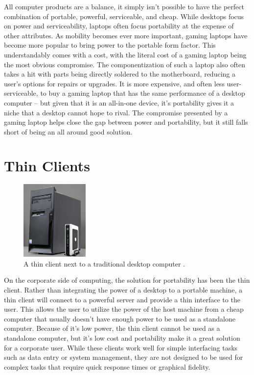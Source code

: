 All computer products are a balance, it simply isn't possible to have the perfect combination of portable, powerful, serviceable, and cheap.
While desktops focus on power and serviceability, laptops often focus portability at the expense of other attributes.
As mobility becomes ever more important, gaming laptops have become more popular to bring power to the portable form factor.
This understandably comes with a cost, with the literal cost of a gaming laptop being the most obvious compromise.
The componentization of such a laptop also often takes a hit with parts being directly soldered to the motherboard, reducing a user's options for repairs or upgrades.
It is more expensive, and often less user-serviceable, to buy a gaming laptop that has the same performance of a desktop computer -- but given that it is an all-in-one device, it's portability gives it a niche that a desktop cannot hope to rival.
The compromise presented by a gaming laptop helps close the gap between power and portability, but it still falls short of being an all around good solution.


\section{Thin Clients}\label{sec:ThinClients}

\begin{figure}
  \centering
  \includegraphics[width=0.3\textwidth]{Figures/ClientronU700}
  \caption[Thin Client]{A thin client next to a traditional desktop computer \cite{ImageThinClient}.}
  \label{fig:ThinClient}
\end{figure}

On the corporate side of computing, the solution for portability has been the thin client.
Rather than integrating the power of a desktop to a portable machine, a thin client will connect to a powerful server and provide a thin interface to the user.
This allows the user to utilize the power of the host machine from a cheap computer that usually doesn't have enough power to be used as a standalone computer.
Because of it's low power, the thin client cannot be used as a standalone computer, but it's low cost and portability make it a great solution for a corporate user.
While these clients work well for simple interfacing tasks such as data entry or system management, they are not designed to be used for complex tasks that require quick response times or graphical fidelity.


